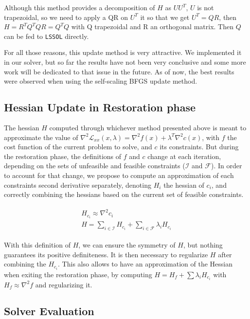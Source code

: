 Although this method provides a decomposition of $H$ as $U U^T$, $U$ is not trapezoidal, so we need to apply a QR on $U^T$ it so that we get $U^T=QR$, then $H=R^T Q^T Q R=Q^T Q$ with Q trapezoidal and R an orthogonal matrix.
Then $Q$ can be fed to {\tt LSSOL} directly.

For all those reasons, this update method is very attractive.
We implemented it in our solver, but so far the results have not been very conclusive and some more work will be dedicated to that issue in the future.
As of now, the best results were observed when using the self-scaling BFGS update method.

\subsection{Hessian Update in Restoration phase}
\label{sub:hessian_update_in_restoration_phase}

The hessian $H$ computed through whichever method presented above is meant to approximate the value of $\nabla^2 \mathcal{L}_{xx}(x,\lambda) = \nabla^2 f(x) + \lambda^T \nabla^2 c(x)$, with $f$ the cost function of the current problem to solve, and $c$ its constraints.
But during the restoration phase, the definitions of $f$ and $c$ change at each iteration, depending on the sets of unfeasible and feasible constraints ($\mathcal{I}$ and $\mathcal{F}$).
In order to account for that change, we propose to compute an approximation of each constraints second derivative separately, denoting $H_i$ the hessian of $c_i$, and correctly combining the hessians based on the current set of feasible constraints.

\begin{align}
  \begin{split}
    H_{c_i} \approx \nabla^2 c_i\\
    H = \sum_{i\in \mathcal{I}}H_{c_i} + \sum_{i\in \mathcal{F}}\lambda_i H_{c_i}
  \end{split}
\end{align}

With this definition of $H$, we can ensure the symmetry of $H$, but nothing guarantees its positive definiteness.
It is then necessary to regularize $H$ after combining the $H_{c_i}$.
This also allows to have an approximation of the Hessian when exiting the restoration phase, by computing $H = H_f + \sum \lambda_i H_{c_i}$ with $H_f \approx \nabla^2 f$ and regularizing it.

\subsection{Solver Evaluation}
\label{sub:solver_evaluation}

